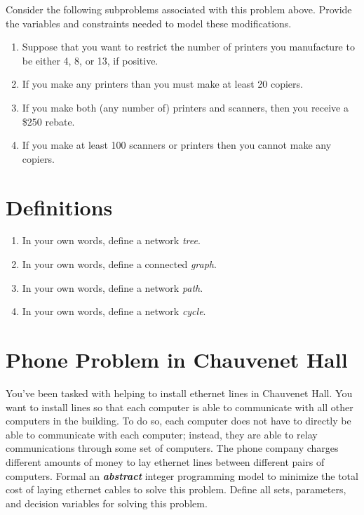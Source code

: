 \documentclass[11pt]{article}
\theoremstyle{definition}
\begin{document}
\newpage
Consider the following subproblems associated with this problem above. Provide the variables and constraints needed to model these modifications.
\begin{enumerate}
\item Suppose that you want to restrict the number of printers you manufacture to be either 4, 8, or 13, if positive. 
\vskip 3cm
\item If you make any printers than you must make at least 20 copiers.
\vskip 3cm
\item If you make both (any number of) printers and scanners, then you receive a \$250 rebate.
\vskip 3cm
\item If you make at least 100 scanners or printers then you cannot make any copiers.
\end{enumerate}

\newpage
\section{Definitions}
\begin{enumerate}
\item In your own words, define a network \emph{tree}.
\vskip 3cm
\item In your own words, define a connected \emph{graph}.
\vskip3cm
\item In your own words, define a network \emph{path}.
\vskip 3cm
\item In your own words, define a network \emph{cycle}.


\end{enumerate}
\newpage
\section{Phone Problem in Chauvenet Hall}
You've been tasked with helping to install ethernet lines in Chauvenet Hall. You want to install lines so that each computer is able to communicate with all other computers in the building. To do so, each computer does not have to directly be able to communicate with each computer; instead, they are able to relay communications through some set of computers. The phone company charges different amounts of money to lay ethernet lines between different pairs of computers. Formal an \emph{\textbf{abstract}} integer programming model to minimize the total cost of laying ethernet cables to solve this problem. Define all sets, parameters, and decision variables for solving this problem.
\end{document}
